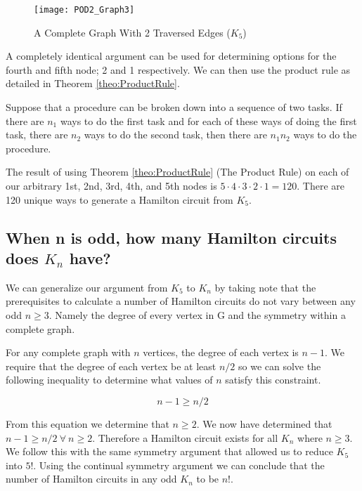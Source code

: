 \documentclass{article}
\begin{document}
\begin{figure}[ht]
\centering
\texttt{[image: POD2\_Graph3]}
\caption{A Complete Graph With 2 Traversed Edges ($K_5$)}
\label{fig:K5_2}
\end{figure}

A completely identical argument can be used for determining options for the fourth and fifth node; 2 and 1 respectively. We can then use the product rule as detailed in Theorem \ref{theo:ProductRule}.

\begin{theo}
Suppose that a procedure can be broken down into a sequence of
two tasks. If there are $n_1$ ways to do the first task and for each of these ways of doing the first
task, there are $n_2$ ways to do the second task, then there are $n_1n_2$ ways to do the procedure.
\label{theo:ProductRule}
\end{theo}

The result of using Theorem \ref{theo:ProductRule} (The Product Rule) on each of our arbitrary 1st, 2nd, 3rd, 4th, and 5th nodes is $5\cdot4\cdot3\cdot2\cdot1=120$. There are 120 unique ways to generate a Hamilton circuit from $K_5$.

\subsection{When n is odd, how many Hamilton circuits does $K_n$ have?}
We can generalize our argument from $K_5$ to $K_n$ by taking note that the prerequisites to calculate a number of Hamilton circuits do not vary between any odd $n \geq 3$. Namely the degree of every vertex in G and the symmetry within a complete graph.


For any complete graph with $n$ vertices, the degree of each vertex is $n-1$. We require that the degree of each vertex be at least $n/2$ so we can solve the following inequality to determine what values of $n$ satisfy this constraint.

\begin{equation}
n-1 \geq n/2
\end{equation}

From this equation we determine that $n \geq 2$. We now have determined that $n-1 \geq n/2 ~\forall~ n \geq 2$. Therefore a Hamilton circuit exists for all $K_n$ where $n \geq 3$. We follow this with the same symmetry argument that allowed us to reduce $K_5$ into $5!$. Using the continual symmetry argument we can conclude that the number of Hamilton circuits in any odd $K_n$ to be $n!$.
\end{document}
